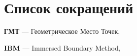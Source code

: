 \newpage

\section*{Список сокращений}

\textbf{ГМТ} --- Геометрическое Место Точек, \pageref{abbr:gmt}

\textbf{IBM} --- Immersed Boundary Method, \pageref{abbr:ibm}
